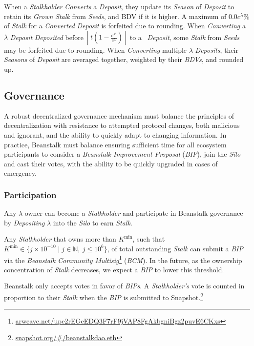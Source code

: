 \documentclass[tikz]{article}
\newcommand{\term}[1]{\textsl{#1}}
\newcommand{\fref}[1]{\footnote{\href{http://#1}{#1}}}
\newcommand{\Bean}{} %
\begin{document}
When a \term{Stalkholder} \term{Converts} a \term{Deposit}, they update its \term{Season} of \term{Deposit} to retain its \term{Grown} \term{Stalk} from \term{Seeds}, and BDV if it is higher. A maximum of $0.0c^\lambda\%$ of \term{Stalk} for a \term{Converted} \term{Deposit} is forfeited due to rounding. When \term{Converting} a $\lambda$ \term{Deposit} \term{Deposited} before $\left\lceil t \left(1 - \frac{c^{\lambda'}}{c^{\lambda}}\right) \right\rceil$ to a \Bean\ \term{Deposit}, some \term{Stalk} from \term{Seeds} may be forfeited due to rounding. When \term{Converting} multiple $\lambda$ \term{Deposits}, their \term{Seasons} of \term{Deposit} are averaged together, weighted by their \term{BDVs}, and rounded up.

\subsection{Governance}
\vspace*{-1mm}
A robust decentralized governance mechanism must balance the principles of decentralization with resistance to attempted protocol changes, both malicious and ignorant, and the ability to quickly adapt to changing information. In practice, Beanstalk must balance ensuring sufficient time for all ecosystem participants to consider a \term{Beanstalk Improvement Proposal} (\term{BIP}), join the \term{Silo} and cast their votes, with the ability to be quickly upgraded in cases of emergency. 

\subsubsection{Participation}
\vspace*{-1mm}
Any $\lambda$ owner can become a \term{Stalkholder} and participate in Beanstalk governance by \term{Depositing} $\lambda$ into the \term{Silo} to earn \term{Stalk}.

Any \term{Stalkholder} that owns more than $K^{\text{min}}$, such that $K^{\text{min}} \in \{j \times 10^{-10} \mid j \in \mathbb{N},\ j \leq 10^{6} \}$, of total outstanding \term{Stalk} can submit a \term{BIP} via the \term{Beanstalk Community Multisig}\fref{arweave.net/upe2rEGeEDQ3F7rF9jVAP8FgAkbgniBgz2puvE6CKxs} (\term{BCM}). In the future, as the ownership concentration of \term{Stalk} decreases, we expect a \term{BIP} to lower this threshold.

Beanstalk only accepts votes in favor of \term{BIPs}. A \term{Stalkholder's} vote is counted in proportion to their \term{Stalk} when the \term{BIP} is submitted to Snapshot.\fref{snapshot.org/\#/beanstalkdao.eth}
\end{document}
